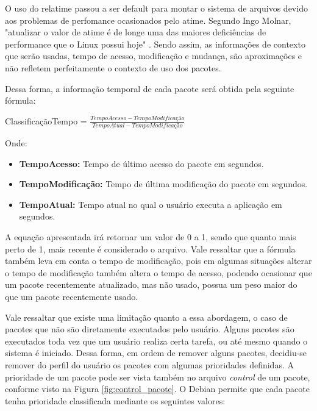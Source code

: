 O uso do relatime passou a ser default para montar o sistema de arquivos devido
aos problemas de perfomance ocasionados pelo atime. Segundo Ingo Molnar, "atualizar o valor
de atime é de longe uma das maiores deficiências de performance que o Linux possui
hoje" \cite{3_corbet_2007}. Sendo assim, as informações de contexto que serão
usadas, tempo de acesso, modificação e mudança, são aproximações e não
refletem perfeitamente o contexto de uso dos pacotes.

Dessa forma, a informação temporal de cada pacote será obtida pela seguinte
fórmula:

ClassificaçãoTempo = $\frac{TempoAcesso - TempoModificação}{TempoAtual -
TempoModificação}$


Onde:

\begin{itemize}
    \item \textbf{TempoAcesso:} Tempo de último acesso do pacote em segundos.
    \item \textbf{TempoModificação:} Tempo de última modificação do pacote em
        segundos.
    \item \textbf{TempoAtual:} Tempo atual no qual o usuário executa a
        aplicação em segundos.
\end{itemize}


A equação apresentada irá retornar um valor de 0 a 1, sendo que quanto mais
perto de 1, mais recente é considerado o arquivo. Vale ressaltar que a fórmula
também leva em conta o tempo de modificação, pois em algumas situações alterar o
tempo de modificação também altera o tempo de acesso, podendo ocasionar que um
pacote recentemente atualizado, mas não usado, possua um peso maior do que um
pacote recentemente usado.

Vale ressaltar que existe uma limitação quanto a essa abordagem, o caso de
pacotes que não são diretamente executados pelo usuário. Alguns pacotes são
executados toda vez que um usuário realiza certa tarefa, ou até mesmo quando o
sistema é iniciado. Dessa forma, em ordem de remover alguns pacotes, decidiu-se
remover do perfil do usuário os pacotes com algumas prioridades definidas. A prioridade de um pacote
pode ser vista também no arquivo \textit{control} de um pacote, conforme visto
na Figura \ref{fig:control_pacote}. O Debian permite que cada pacote tenha
prioridade classificada mediante os seguintes valores:

